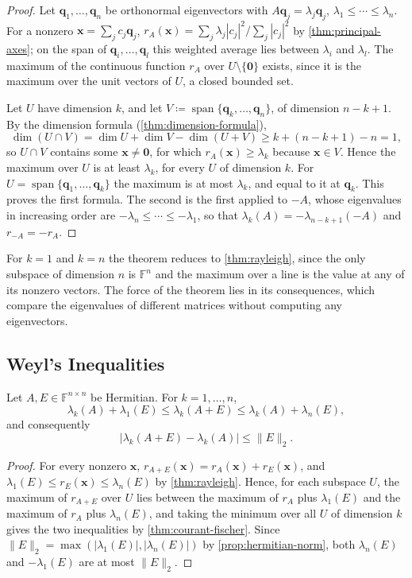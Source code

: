 \begin{proof}
Let $\mathbf q_1,\ldots,\mathbf q_n$ be orthonormal eigenvectors with $A\mathbf q_j=\lambda_j\mathbf q_j$, $\lambda_1\le\cdots\le\lambda_n$. For a nonzero $\mathbf x=\sum_jc_j\mathbf q_j$, $r_A(\mathbf x)=\sum_j\lambda_j|c_j|^2/\sum_j|c_j|^2$ by \cref{thm:principal-axes}; on the span of $\mathbf q_i,\ldots,\mathbf q_l$ this weighted average lies between $\lambda_i$ and $\lambda_l$. The maximum of the continuous function $r_A$ over $U\setminus\{\mathbf 0\}$ exists, since it is the maximum over the unit vectors of $U$, a closed bounded set.

Let $U$ have dimension $k$, and let $V\coloneqq\operatorname{span}\{\mathbf q_k,\ldots,\mathbf q_n\}$, of dimension $n-k+1$. By the dimension formula (\cref{thm:dimension-formula}),
\[
\dim(U\cap V)=\dim U+\dim V-\dim(U+V)\ge k+(n-k+1)-n=1 ,
\]
so $U\cap V$ contains some $\mathbf x\ne\mathbf 0$, for which $r_A(\mathbf x)\ge\lambda_k$ because $\mathbf x\in V$. Hence the maximum over $U$ is at least $\lambda_k$, for every $U$ of dimension $k$. For $U=\operatorname{span}\{\mathbf q_1,\ldots,\mathbf q_k\}$ the maximum is at most $\lambda_k$, and equal to it at $\mathbf q_k$. This proves the first formula. The second is the first applied to $-A$, whose eigenvalues in increasing order are $-\lambda_n\le\cdots\le-\lambda_1$, so that $\lambda_k(A)=-\lambda_{n-k+1}(-A)$ and $r_{-A}=-r_A$.
\end{proof}

For $k=1$ and $k=n$ the theorem reduces to \cref{thm:rayleigh}, since the only subspace of dimension $n$ is $\mathbb F^n$ and the maximum over a line is the value at any of its nonzero vectors. The force of the theorem lies in its consequences, which compare the eigenvalues of different matrices without computing any eigenvectors.

\subsection{Weyl's Inequalities}

\begin{theorem}
\label{thm:weyl}
Let $A,E\in\mathbb F^{n\times n}$ be Hermitian. For $k=1,\ldots,n$,
\[
\lambda_k(A)+\lambda_1(E)\le\lambda_k(A+E)\le\lambda_k(A)+\lambda_n(E),
\]
and consequently
\[
|\lambda_k(A+E)-\lambda_k(A)|\le\|E\|_2 .
\]
\end{theorem}

\begin{proof}
For every nonzero $\mathbf x$, $r_{A+E}(\mathbf x)=r_A(\mathbf x)+r_E(\mathbf x)$, and $\lambda_1(E)\le r_E(\mathbf x)\le\lambda_n(E)$ by \cref{thm:rayleigh}. Hence, for each subspace $U$, the maximum of $r_{A+E}$ over $U$ lies between the maximum of $r_A$ plus $\lambda_1(E)$ and the maximum of $r_A$ plus $\lambda_n(E)$, and taking the minimum over all $U$ of dimension $k$ gives the two inequalities by \cref{thm:courant-fischer}. Since $\|E\|_2=\max(|\lambda_1(E)|,|\lambda_n(E)|)$ by \cref{prop:hermitian-norm}, both $\lambda_n(E)$ and $-\lambda_1(E)$ are at most $\|E\|_2$.
\end{proof}

